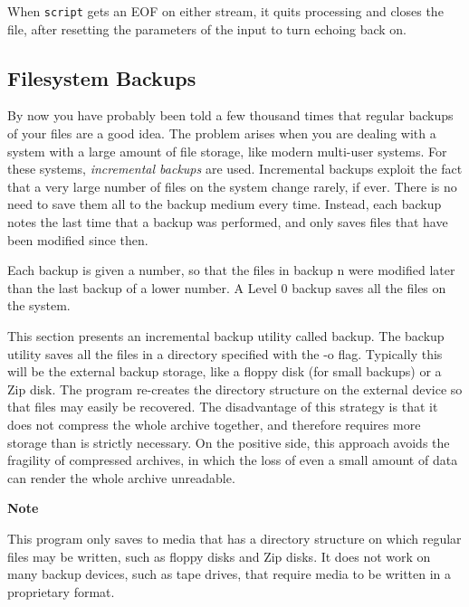 When \texttt{script} gets an EOF on either stream, it quits processing
and closes the file, after resetting the parameters of the input to
turn echoing back on. 


\subsection{Filesystem Backups}

By now you have probably been told a few thousand times that regular
backups of your files are a good idea. The problem
arises when you are dealing with a system with a large amount of file
storage, like modern multi-user systems. For these systems,
\textit{incremental backups} are used. Incremental backups exploit the
fact that a very large number of files on the system change rarely, if
ever. There is no need to save them all to the backup medium every
time. Instead, each backup notes the last time that a backup was
performed, and only saves files that have been modified since then. 

Each backup is given a number, so that the files in backup n were
modified later than the last backup of a lower number. A Level 0 backup
saves all the files on the system. 

This section presents an incremental backup utility called
\textsf{backup}. The \textsf{backup} utility saves all the files in a
directory specified with the \textsf{{}-o} flag. Typically this will be
the external backup storage, like a floppy disk (for small backups) or
a Zip disk. The program re-creates the directory structure on the
external device so that files may easily be recovered. The disadvantage
of this strategy is that it does not compress the whole archive
together, and therefore requires more storage than is strictly
necessary. On the positive side, this approach avoids the fragility of
compressed archives, in which the loss of even a small amount of data
can render the whole archive unreadable. 

{\sffamily\bfseries
Note}

{\sffamily
This program only saves to media that has a directory structure on which
regular files may be written, such as floppy disks and
Zip\textrm{{\textregistered}} disks. It does not work on many backup
devices, such as tape drives, that require media to be written in a
proprietary format.}

